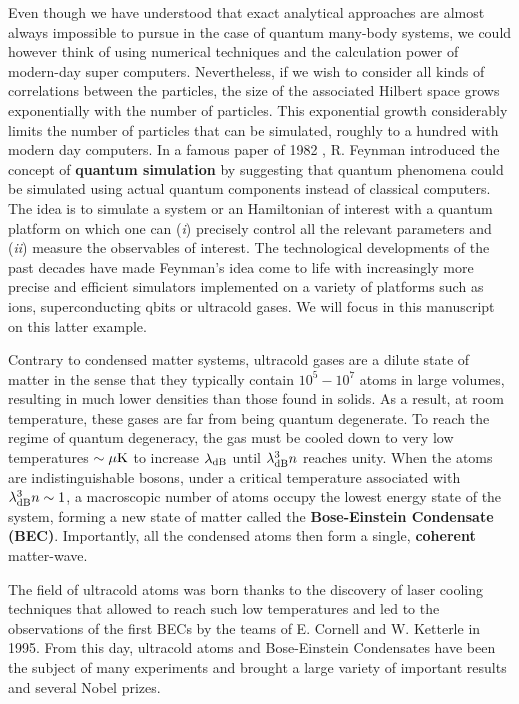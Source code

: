 Even though we have understood that exact analytical approaches are almost always impossible to pursue in the case of quantum many-body systems, we could however think of using numerical techniques and the calculation power of modern-day super computers. Nevertheless, if we wish to consider all kinds of correlations between the particles, the size of the associated Hilbert space grows exponentially with the number of particles. This exponential growth considerably limits the number of particles that can be simulated, roughly to a hundred with modern day computers. In a famous paper of 1982 \cite{Feynman1982Simulating}, R. Feynman introduced the concept of \textbf{quantum simulation} by suggesting that quantum phenomena could be simulated using actual quantum components instead of classical computers. The idea is to simulate a system or an Hamiltonian of interest with a quantum platform on which one can (\textit{i}) precisely control all the relevant parameters and (\textit{ii}) measure the observables of interest. The technological developments of the past decades have made Feynman's idea come to life with increasingly more precise and efficient simulators implemented on a variety of platforms such as ions, superconducting qbits or ultracold gases. We will focus in this manuscript on this latter example.  

Contrary to condensed matter systems, ultracold gases are a dilute state of matter in the sense that they typically contain $10^5-10^7$ atoms in large volumes, resulting in much lower densities than those found in solids. As a result, at room temperature, these gases are far from being quantum degenerate. To reach the regime of quantum degeneracy, the gas must be cooled down to very low temperatures $\sim \mu \rm{K}$ to increase $\lambda_{\rm{dB}}$ until $\lambda_{\rm{dB}}^3 n$ reaches unity. When the atoms are indistinguishable  bosons, under a critical temperature associated with $\lambda_{\rm{dB}}^3 n \sim 1$, a macroscopic number of atoms occupy the lowest energy state of the system, forming a new state of matter called the \textbf{Bose-Einstein Condensate (BEC)}. Importantly, all the condensed atoms then form a single, \textbf{coherent} matter-wave. 

The field of ultracold atoms was born thanks to the discovery of laser cooling techniques \cite{chu1985three,dalibard1989laser,phillips1982laser} that allowed to reach such low temperatures and led to the observations of the first BECs by the teams of E. Cornell \cite{anderson1995observation} and W. Ketterle \cite{davis1995bose} in 1995. From this day, ultracold atoms and Bose-Einstein Condensates have been the subject of many experiments and brought a large variety of important results and several Nobel prizes.

